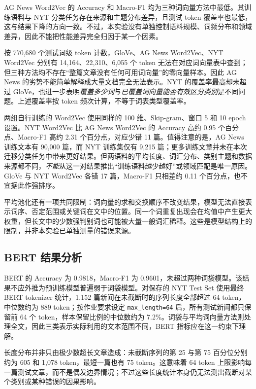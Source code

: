 \documentclass[UTF8,a4paper,10pt]{ctexart}
\newcommand{\method}[1]{\texttt{#1}}
\begin{document}
AG News Word2Vec 的 Accuracy 和 Macro-F1 均为三种词向量方法中最低。其训练语料与 NYT 分类任务存在来源和主题分布差异，且测试 token 覆盖率也最低，这与结果下降的方向一致。不过，本实验没有单独控制语料规模、词频分布和领域差异，因此不能把性能差异完全归因于某一个因素。

按 770,680 个测试词级 token 计数，GloVe、AG News Word2Vec、NYT Word2Vec 分别有 14,164、22,310、6,055 个 token 无法在对应词向量表中查到；但三种方法均不存在“整篇文章没有任何可用词向量”的零向量样本。因此 AG News 的劣势不能简单解释成大量文档完全无法表示。NYT 的覆盖率最高却未超过 GloVe，也进一步表明\emph{覆盖多少词}与\emph{已覆盖词向量能否有效区分类别}是不同问题。上述覆盖率按 token 频次计算，不等于词表类型覆盖率。

两组自行训练的 Word2Vec 使用同样的 100 维、Skip-gram、窗口 5 和 10 epoch 设置。NYT Word2Vec 比 AG News Word2Vec 的 Accuracy 高约 0.95 个百分点、Macro-F1 高约 2.31 个百分点，对应少错 11 篇。值得注意的是，AG News 训练文本有 90,000 篇，而 NYT 训练集仅有 9,215 篇；更多训练文章并未在本次迁移分类任务中带来更好结果。但两语料的平均长度、词汇分布、类别主题和数据来源都不同，\emph{不能}从这一对结果推出“训练语料越少越好”或领域匹配是唯一原因。GloVe 与 NYT Word2Vec 各错 17 篇，Macro-F1 只相差约 0.11 个百分点，也不宜据此作强排序。

平均池化还有一项共同限制：词向量的求和交换顺序不改变结果，模型无法直接表示词序、否定范围或关键词在文中的位置。同一个词重复出现会在均值中产生更大权重，但长文中的少数强判别词也可能被大量一般词汇稀释。这些是模型结构上的限制，并非本实验已单独测量的错误来源。

\subsection{BERT 结果分析}

BERT 的 Accuracy 为 0.9818，Macro-F1 为 0.9601，未超过两种词袋模型。该结果不应外推为预训练模型普遍弱于词袋模型。对保存的 NYT Test Set 使用最终 BERT tokenizer 统计，1,152 篇新闻在未截断时的序列长度全部超过 64 token，中位数约为 889 token；按作业要求设定 \method{max\_length=64} 后，所有测试新闻都只保留前 64 个 token，样本保留比例的中位数约为 7.2\%。词袋与平均词向量方法则处理全文，因此三类表示实际利用的文本范围不同，BERT 指标应在这一约束下理解。

长度分布并非只由极少数超长文章造成：未截断序列的第 25 与第 75 百分位分别约为 605 和 1,078 token，最短一篇也有 75 token。这意味着 64 token 上限影响每一篇测试文章，而不是偶发边界情况；不过这些长度统计本身仍无法测出截断对某个类别或某种错误的因果影响。
\end{document}
